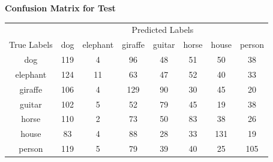 \documentclass{article}
\begin{document}
    \begin{center}
    \textbf{Confusion Matrix for Test}
    
    \begin{tabular}{cccccccc}
    \toprule
    & \multicolumn{7}{c}{Predicted Labels} \\
    \cmidrule(lr){2-8}
    True Labels & dog & elephant & giraffe & guitar & horse & house & person \\
    \midrule
    dog & 119 & 4 & 96 & 48 & 51 & 50 & 38 \\
    elephant & 124 & 11 & 63 & 47 & 52 & 40 & 33 \\
    giraffe & 106 & 4 & 129 & 90 & 30 & 45 & 20 \\
    guitar & 102 & 5 & 52 & 79 & 45 & 19 & 38 \\
    horse & 110 & 2 & 73 & 50 & 83 & 38 & 26 \\
    house & 83 & 4 & 88 & 28 & 33 & 131 & 19 \\
    person & 119 & 5 & 79 & 39 & 40 & 25 & 105 \\
    \bottomrule
    \end{tabular}
    \label{tab:confusion_matrix_test}
\end{center}
\end{document}

